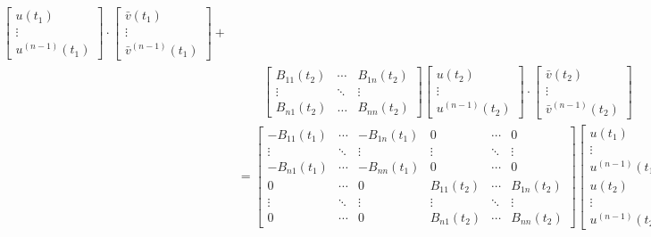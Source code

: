 \documentclass[12pt, oneside, a4paper]{article}
\begin{document}
\begin{equation}
\begin{split}
\begin{bmatrix}
    u(t_1)\\
    \vdots\\
    u^{(n-1)}(t_1)
    \end{bmatrix}\cdot 
    \begin{bmatrix}
        \bar{v}(t_1)\\
        \vdots\\
        \bar{v}^{(n-1)}(t_1)
    \end{bmatrix} + \\
    &\qquad \begin{bmatrix}
        B_{11}(t_2) & \cdots & B_{1n}(t_2)\\
        \vdots & \ddots & \vdots\\
        B_{n1}(t_2) & \ldots & B_{nn}(t_2)
    \end{bmatrix} 
    \begin{bmatrix}
    u(t_2)\\
    \vdots\\
    u^{(n-1)}(t_2)
    \end{bmatrix}\cdot 
    \begin{bmatrix}
        \bar{v}(t_2)\\
        \vdots\\
        \bar{v}^{(n-1)}(t_2)
    \end{bmatrix}\\
    &= \begin{bmatrix}
        -B_{11}(t_1) & \cdots & -B_{1n}(t_1) & 0 & \cdots & 0\\
        \vdots & \ddots & \vdots & \vdots & \ddots & \vdots\\
        -B_{n1}(t_1) & \cdots & -B_{nn}(t_1) & 0 & \cdots & 0\\
        0 & \cdots & 0 & B_{11}(t_2) & \cdots & B_{1n}(t_2)\\
        \vdots & \ddots & \vdots & \vdots & \ddots & \vdots\\
        0 & \cdots & 0 & B_{n1}(t_2) & \cdots & B_{nn}(t_2)
    \end{bmatrix} 
    \begin{bmatrix}
        u(t_1)\\
        \vdots\\
        u^{(n-1)}(t_1)\\
        u(t_2)\\
        \vdots\\
        u^{(n-1)}(t_2)
    \end{bmatrix}\cdot
    \begin{bmatrix}
        \bar{v}(t_1)\\

\end{bmatrix}
\end{split}
\end{equation}
\end{document}
